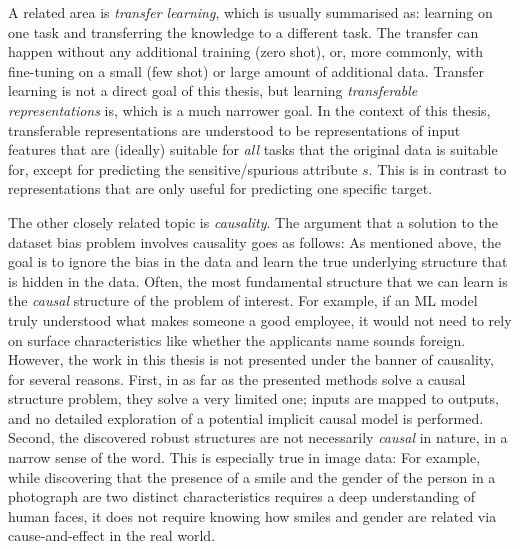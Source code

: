 A related area is \emph{transfer learning},
which is usually summarised as:
learning on one task and transferring the knowledge to a different task.
The transfer can happen without any additional training (zero shot),
or, more commonly, with fine-tuning on a small (few shot) or large amount of additional data.
Transfer learning is not a direct goal of this thesis,
but learning \emph{transferable representations} is,
which is a much narrower goal.
In the context of this thesis,
transferable representations are understood to be representations of input features
that are (ideally) suitable for \emph{all} tasks that the original data is suitable for,
except for predicting the sensitive\slash spurious attribute \(s\).
This is in contrast to representations that are only useful for predicting one specific target.

The other closely related topic is \emph{causality}.
The argument that a solution to the dataset bias problem involves causality goes as follows:
As mentioned above, the goal is to ignore the bias in the data
and learn the true underlying structure that is hidden in the data.
Often, the most fundamental structure that we can learn is the \emph{causal} structure of the problem of interest.
For example, if an \acs{ML} model truly understood what makes someone a good employee,
it would not need to rely on surface characteristics like whether the applicants name sounds foreign.
However, the work in this thesis is not presented under the banner of causality, for several reasons.
First, in as far as the presented methods solve a causal structure problem, they solve a very limited one;
inputs are mapped to outputs, and no detailed exploration of a potential implicit causal model is performed.
Second, the discovered robust structures are not necessarily \emph{causal} in nature, in a narrow sense of the word.
This is especially true in image data:
For example, while discovering that the presence of a smile and the gender of the person in a photograph are two distinct characteristics
requires a deep understanding of human faces,
it does not require knowing how smiles and gender are related via cause-and-effect in the real world.

